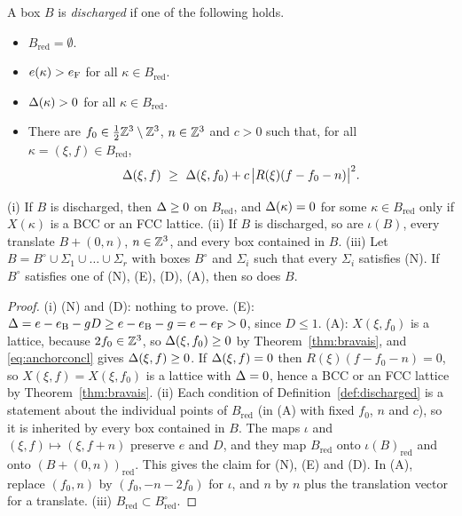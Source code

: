 \begin{definition}\label{def:discharged}
A box $B$ is \emph{discharged} if one of the following holds.
\begin{itemize}
\item[(N)] $B_{\mathrm{red}}=\emptyset$.
\item[(E)] $e(\kappa)>e_{\mathrm F}$ for all $\kappa\in B_{\mathrm{red}}$.
\item[(D)] $\Delta(\kappa)>0$ for all $\kappa\in B_{\mathrm{red}}$.
\item[(A)] There are $f_0\in\frac12\mathbb Z^3\setminus\mathbb Z^3$, $n\in\mathbb Z^3$ and $c>0$ such that, for all $\kappa=(\xi,f)\in B_{\mathrm{red}}$,
\begin{equation}\label{eq:anchorconcl}
  \Delta(\xi,f)\ \ge\ \Delta(\xi,f_0)+c\,\bigl|R(\xi)(f-f_0-n)\bigr|^2 .
\end{equation}
\end{itemize}
\end{definition}

\begin{lemma}\label{lem:discharged}
\textup{(i)} If $B$ is discharged, then $\Delta\ge0$ on $B_{\mathrm{red}}$, and $\Delta(\kappa)=0$ for some $\kappa\in B_{\mathrm{red}}$ only if
$X(\kappa)$ is a BCC or an FCC lattice.
\textup{(ii)} If $B$ is discharged, so are $\iota(B)$, every translate $B+(0,n)$, $n\in\mathbb Z^3$, and every box contained in $B$.
\textup{(iii)} Let $B=B^\circ\cup\Sigma_1\cup\dots\cup\Sigma_r$ with boxes $B^\circ$ and $\Sigma_i$ such that every $\Sigma_i$ satisfies
\textup{(N)}. If $B^\circ$ satisfies one of \textup{(N)}, \textup{(E)}, \textup{(D)}, \textup{(A)}, then so does $B$.
\end{lemma}

\begin{proof}
(i) (N) and (D): nothing to prove. (E): $\Delta=e-e_{\mathrm B}-g D\ge e-e_{\mathrm B}-g=e-e_{\mathrm F}>0$, since $D\le1$.
(A): $X(\xi,f_0)$ is a lattice, because $2f_0\in\mathbb Z^3$, so $\Delta(\xi,f_0)\ge0$ by Theorem~\ref{thm:bravais}, and \eqref{eq:anchorconcl} gives
$\Delta(\xi,f)\ge0$. If $\Delta(\xi,f)=0$ then $R(\xi)(f-f_0-n)=0$, so $X(\xi,f)=X(\xi,f_0)$ is a lattice with $\Delta=0$, hence a BCC or
an FCC lattice by Theorem~\ref{thm:bravais}.
(ii) Each condition of Definition~\ref{def:discharged} is a statement about the individual points of $B_{\mathrm{red}}$ (in (A) with
fixed $f_0$, $n$ and $c$), so it is inherited by every box contained in $B$. The maps $\iota$ and $(\xi,f)\mapsto(\xi,f+n)$ preserve
$e$ and $D$, and they map $B_{\mathrm{red}}$ onto $\iota(B)_{\mathrm{red}}$ and onto $(B+(0,n))_{\mathrm{red}}$. This gives the claim
for (N), (E) and (D). In (A), replace $(f_0,n)$ by $(f_0,-n-2f_0)$ for $\iota$, and $n$ by $n$ plus the translation vector for a
translate.
(iii) $B_{\mathrm{red}}\subset B^\circ_{\mathrm{red}}$.
\end{proof}

